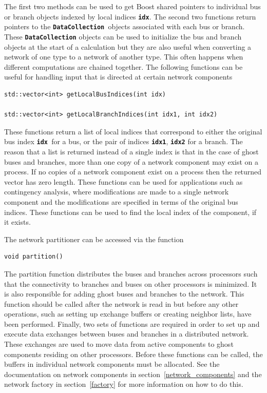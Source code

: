 The first two methods can be used to get Boost shared pointers to individual bus or branch objects indexed by local indices \texttt{\textbf{idx}}. The second two functions return pointers to the \texttt{\textbf{DataCollection }}objects associated with each bus or branch. These \texttt{\textbf{DataCollection}} objects can be used to initialize the bus and branch objects at the start of a calculation but they are also useful when converting a network of one type to a network of another type. This often happens when different computations are chained together.
The following functions can be useful for handling input that is directed at certain network components

{
\color{red}
\begin{Verbatim}[fontseries=b]
std::vector<int> getLocalBusIndices(int idx)

std::vector<int> getLocalBranchIndices(int idx1, int idx2)
\end{Verbatim}
}

These functions return a list of local indices that correspond to either the original bus index \texttt{\textbf{idx }}for a bus, or the pair of indices \texttt{\textbf{idx1}}, \texttt{\textbf{idx2}} for a branch. The reason that a list is returned instead of a single index is that in the case of ghost buses and branches, more than one copy of a network component may exist on a process. If no copies of a network component exist on a process then the returned vector has zero length. These functions can be used for applications such as contingency analysis, where modifications are made to a single network component and the modifications are specified in terms of the original bus indices. These functions can be used to find the local index of the component, if it exists. 

The network partitioner can be accessed via the function

{
\color{red}
\begin{Verbatim}[fontseries=b]
void partition()
\end{Verbatim}
}

The partition function distributes the buses and branches across processors such that the connectivity to branches and buses on other processors is minimized. It is also responsible for adding ghost buses and branches to the network. This function should be called after the network is read in but before any other operations, such as setting up exchange buffers or creating neighbor lists, have been performed.
Finally, two sets of functions are required in order to set up and execute data
exchanges between buses and branches in a distributed network. These exchanges
are used to move data from active components to ghost components residing on
other processors. Before these functions can be called, the buffers in
individual network components must be allocated. See the documentation on
network components in section~\ref{network_components} and the network factory
in section~\ref{factory} for more information on how to do this.

